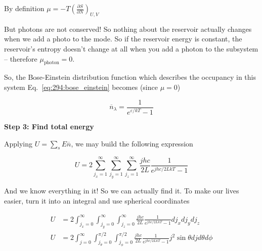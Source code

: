 \documentclass[10pt]{article}
\begin{document}
By definition   $ \mu = -T \left( \frac{\partial S}{\partial N}  \right) _{U, V} $ 


But photons are not conserved! 
So nothing about the reservoir actually changes when we add a photo to the mode.
So if the reservoir energy is constant, the reservoir's entropy doesn't change at all when you add a photon to the subsystem -- therefore $ \mu_{\text{photon}} = 0 $. 

So, the Bose-Einstein distribution function which describes the occupancy in this system Eq.~\ref{eq:294:bose_einstein} becomes (since $\mu = 0$)

\begin{equation}
	\overline{n}_\lambda = \frac{1}{e^{\varepsilon /kT} - 1}
\end{equation}



\textbf{Step 3: Find total energy} 

Applying $ U = \sum_s E \overline{n}$, we may build the following expression

\begin{equation}
	U = 2
	\sum^{\infty}_{j_x = 1}
	\sum^{\infty}_{j_y = 1}
	\sum^{\infty}_{j_z = 1}
	\frac{jhc}{2L}
	\frac{1}{e^{jhc /2LkT} - 1}
\end{equation}

And we know everything in it! So we can actually find it. 
To make our lives easier, turn it into an integral and use spherical coordinates



\begin{equation}
	\begin{split}
		U &= 2 \int^{\infty}_{j_x = 0} \int^{\infty}_{j_y = 0} \int^{\infty}_{j_z = 0} \frac{jhc}{2L} \frac{1}{e^{jhc /2LkT} - 1} dj_x dj_y dj_z \\
		U &= 2 \int^\infty_{j = 0} \int^{\pi /2}_{j_\theta  = 0} \int^{\pi /2}_{j_ \phi = 0} \frac{jhc}{2L} \frac{1}{e^{jhc /2LkT} - 1}  j^2 \sin \theta dj d\theta d\phi \\
	\end{split}
\end{equation}
\end{document}
